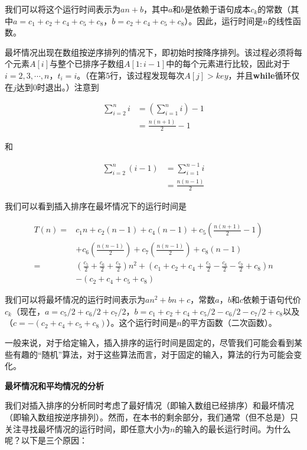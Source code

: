 \documentclass[lang=cn,newtx,10pt,scheme=chinese]{elegantbook}
\begin{document}
我们可以将这个运行时间表示为$an+b$，其中$a$和$b$是依赖于语句成本$c_k$的常数（其中$a = c_1 + c_2 + c_4 + c_5 + c_8$，$b = c_2 + c_4 + c_5 + c_8$）。因此，运行时间是$n$的线性函数。

最坏情况出现在数组按逆序排列的情况下，即初始时按降序排列。该过程必须将每个元素$A[i]$与整个已排序子数组$A[1:i-1]$中的每个元素进行比较，因此对于$i=2,3,\cdots,n$，$t_i = i$。（在第5行，该过程发现每次$A[j] > key$，并且\textbf{while}循环仅在$j$达到0时退出。）注意到

\begin{equation*}
\begin{aligned}
\sum_{i=2}^n i & =(\sum_{i=1}^n i)-1 \\
& =\frac{n(n+1)}{2}-1
\end{aligned}
\end{equation*}

和

\begin{equation*}
\begin{aligned}
\sum_{i=2}^n(i-1) & =\sum_{i=1}^{n-1} i \\
& =\frac{n(n-1)}{2}
\end{aligned}
\end{equation*}

我们可以看到插入排序在最坏情况下的运行时间是

\begin{equation}\label{eq:2.2}
\begin{aligned}
T(n)= & c_1 n+c_2(n-1)+c_4(n-1)+c_5(\frac{n(n+1)}{2}-1) \\
& +c_6(\frac{n(n-1)}{2})+c_7(\frac{n(n-1)}{2})+c_8(n-1) \\
= & (\frac{c_5}{2}+\frac{c_6}{2}+\frac{c_7}{2}) n^2+(c_1+c_2+c_4+\frac{c_5}{2}-\frac{c_6}{2}-\frac{c_7}{2}+c_8) n \\
& -(c_2+c_4+c_5+c_8)
\end{aligned}
\end{equation}

我们可以将最坏情况的运行时间表示为$an^2+bn+c$，常数$a$，$b$和$c$依赖于语句代价$c_k$（现在，$a=c_5 / 2+c_6 / 2+c_7 / 2$，$b=c_1+c_2+c_4+c_5 / 2-c_6 / 2-c_7 / 2+c_8$以及（$c=-(c_2+c_4+c_5+c_8)$）。这个运行时间是$n$的平方函数（二次函数）。

一般来说，对于给定输入，插入排序的运行时间是固定的，尽管我们可能会看到某些有趣的``随机''算法，对于这些算法而言，对于固定的输入，算法的行为可能会变化。

\textbf{最坏情况和平均情况的分析}

我们对插入排序的分析同时考虑了最好情况（即输入数组已经排序）和最坏情况（即输入数组按逆序排列）。然而，在本书的剩余部分，我们通常（但不总是）只关注寻找最坏情况的运行时间，即任意大小为$n$的输入的最长运行时间。为什么呢？以下是三个原因：
\end{document}
